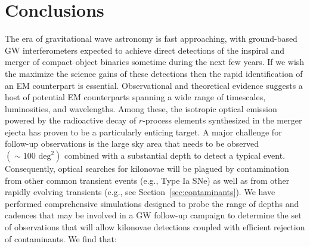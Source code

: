 \section{Conclusions}
\label{sec:conc}
The era of gravitational wave astronomy is fast approaching, with ground-based GW interferometers expected to achieve direct detections of the inspiral and merger of compact object binaries sometime during the next few years. If we wish the maximize the science gains of these detections then the rapid identification of an EM counterpart is essential.  Observational and theoretical evidence suggests a host of potential EM counterparts spanning a wide range of timescales, luminosities, and wavelengths. Among these, the isotropic optical emission powered by the radioactive decay of $r$-process elements synthesized in the merger ejecta has proven to be a particularly enticing target. A major challenge for follow-up observations is the large sky area that needs to be observed $(\sim100\text{ deg}^2)$ combined with a substantial depth to detect a typical event. Consequently, optical searches for kilonovae will be plagued by contamination from other common transient events (e.g., Type Ia SNe) as well as from other rapidly evolving transients (e.g., see Section~\ref{sec:contaminants}). We have performed comprehensive simulations designed to probe the range of depths and cadences that may be involved in a GW follow-up campaign to determine the set of observations that will allow kilonovae detections coupled with efficient rejection of contaminants. We find that:


